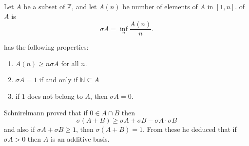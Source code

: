 \documentclass[12pt]{article}
\begin{document}
Let $A$ be a subset of $\mathbb{Z}$, and let $A(n)$ be number of elements of $A$ in $[1,n]$. \emph{} of $A$ is
\begin{equation*}
\sigma A = \inf_n \frac{A(n)}{n}.
\end{equation*}

 has the following properties:
\begin{enumerate}
\item $A(n)\geq n \sigma A$ for all $n$.
\item $\sigma A=1$ if and only if $\mathbb{N}\subseteq A$
\item if $1$ does not belong to $A$, then $\sigma A=0$.
\end{enumerate}

Schnirelmann proved that if $0 \in A \cap B$ then
\begin{equation*}
\sigma(A+B)\geq \sigma A + \sigma B - \sigma A \cdot \sigma B
\end{equation*}
and also if $\sigma A + \sigma B \geq 1$, then $\sigma (A+B)=1$. From these he deduced that if $\sigma A>0$ then $A$ is an additive basis.
\end{document}
